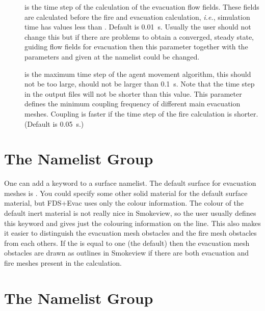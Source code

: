 \documentclass[12pt,a4paper,final,twoside]{stylevk}
\begin{document}
\begin{description}
%
\item[] is the time step of the calculation
  of the evacuation flow fields.  These fields are calculated before
  the fire and evacuation calculation, \emph{i.e.}, simulation time
  has values less than .  Default is 0.01~s.  Usually
  the user should not change this but if there are problems to obtain
  a converged, steady state, guiding flow fields for evacuation then
  this parameter together with the parameters
   and
   given at the 
  namelist could be changed.
%
\item[] is the maximum time step of the
  agent movement algorithm, this should not be too large, should not
  be larger than 0.1~s.  Note that the time step in the output files
  will not be shorter than this value.  This parameter defines the
  minimum coupling frequency of different main evacuation meshes.
  Coupling is faster if the time step of the fire calculation is
  shorter. (Default is 0.05~s.)
%
\end{description}



\section{The  Namelist Group}\label{Sec_SurfNML}

\noindent One can add a keyword  to a
surface namelist.  The default surface for evacuation meshes is
.  You could specify some other solid material for the
default surface material, but FDS+Evac uses only the colour
information.  The colour of the default inert material is not really
nice in Smokeview, so the user usually defines this keyword and gives
just the colouring information on the  line.  This also
makes it easier to distinguish the evacuation mesh obstacles and the
fire mesh obstacles from each others.  If the  is
equal to one (the default) then the evacuation mesh obstacles are
drawn as outlines in Smokeview if there are both evacuation and fire
meshes present in the calculation.


\section{The  Namelist Group}\label{Sec_MiscNML}
\end{document}
